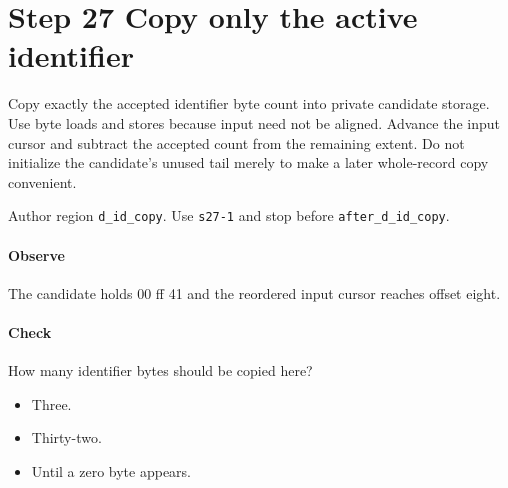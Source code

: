 \section{Step 27 Copy only the active identifier}\label{cbor-s27}
Copy exactly the accepted identifier byte count into private candidate storage. Use byte loads and stores because input need not be aligned. Advance the input cursor and subtract the accepted count from the remaining extent. Do not initialize the candidate's unused tail merely to make a later whole-record copy convenient.

Author region \texttt{d\_id\_copy}. Use \texttt{s27-1} and stop before \texttt{after\_d\_id\_copy}.

\paragraph{Observe} The candidate holds 00 ff 41 and the reordered input cursor reaches offset eight.

\paragraph{Check} How many identifier bytes should be copied here?
\begin{itemize}
\item[A.] Three.
\item[B.] Thirty-two.
\item[C.] Until a zero byte appears.
\end{itemize}

